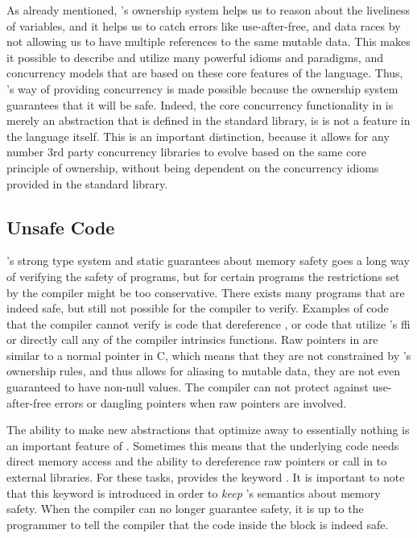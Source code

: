 As already mentioned, \rust's ownership system helps us to reason about the liveliness of variables, and it helps us to catch errors like use-after-free, and data races by not allowing us to have multiple references to the same mutable data.
This makes it possible to describe and utilize many powerful idioms and paradigms, and concurrency models that are based on these core features of the language.
Thus, \rust's way of providing concurrency is made possible because the ownership system guarantees that it will be safe.
Indeed, the core concurrency functionality in \rust is merely an abstraction that is defined in the standard library, is is not a feature in the language itself.
This is an important distinction, because it allows for any number 3rd party concurrency libraries to evolve based on the same core principle of ownership, without being dependent on the concurrency idioms provided in the standard library.

\subsection{Unsafe Code} %
\label{ssub:unsafe_code}

\rust's strong type system and static guarantees about memory safety goes a long way of verifying the safety of programs, but for certain programs the restrictions set by the compiler might be too conservative.
There exists many programs that are indeed safe, but still not possible for the compiler to verify.
Examples of code that the compiler cannot verify is code that dereference , or code that utilize \rust's \gls{ffi} or directly call any of the compiler intrinsics functions.
Raw pointers in \rust are similar to a normal pointer in C, which means that they are not constrained by \rust's ownership rules, and thus allows for aliasing to mutable data, they are not even guaranteed to have non-null values.
The compiler can not protect against use-after-free errors or dangling pointers when raw pointers are involved.

The ability to make new abstractions that optimize away to essentially nothing is an important feature of \rust.
Sometimes this means that the underlying code needs direct memory access and the ability to dereference raw pointers or call in to external libraries.
For these tasks, \rust provides the keyword \unsafe.
It is important to note that this \unsafe keyword is introduced in order to \emph{keep} \rust's semantics about memory safety.
When the compiler can no longer guarantee safety, it is up to the programmer to tell the compiler that the code inside the \unsafe block is indeed safe.

